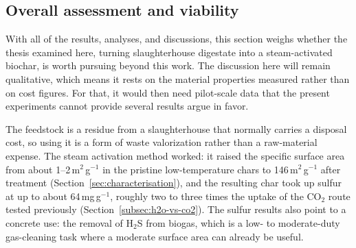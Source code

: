 \vspace{0.3em}




\subsection{Overall assessment and viability}
\label{subsec:assessment}
With all of the results, analyses, and discussions, this section weighs whether the thesis examined here, turning slaughterhouse digestate into a steam-activated biochar, is worth pursuing beyond this work. The discussion here will remain qualitative, which means it rests on the material properties measured rather than on cost figures. For that, it would then need pilot-scale data that the present experiments cannot provide several results argue in favor. 

\vspace{0.3em}

The feedstock is a residue from a slaughterhouse that normally carries a disposal cost, so using it is a form of waste valorization rather than a raw-material expense. The steam activation method worked: it raised the specific surface area from about 1--2\,m$^2$\,g$^{-1}$ in the pristine low-temperature chars to 146\,m$^2$\,g$^{-1}$ after treatment (Section~\ref{sec:characterisation}), and the resulting char took up sulfur at up to about 64\,mg\,g$^{-1}$, roughly two to three times the uptake of the CO$_2$ route tested previously (Section~\ref{subsec:h2o-vs-co2}). The sulfur results also point to a concrete use: the removal of H$_2$S from biogas, which is a low- to moderate-duty gas-cleaning task where a moderate surface area can already be useful.

